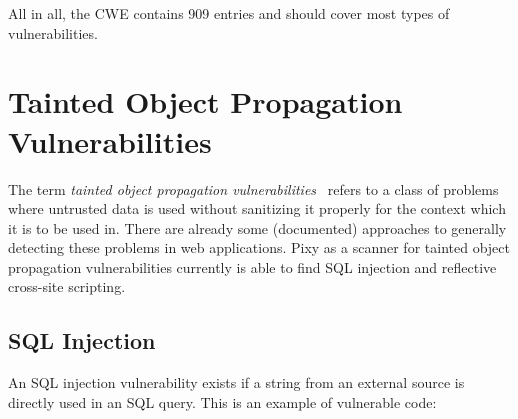 All in all, the CWE contains 909 entries and should cover most types of vulnerabilities.~\cite{cwe-all}

\section{Tainted Object Propagation Vulnerabilities}
The term \emph{tainted object propagation vulnerabilities}~\cite{finding-security-vulnerabilities} refers to a class of problems where untrusted data is used without sanitizing it properly for the context which it is to be used in. There are already some (documented) approaches to generally detecting these problems in web applications. Pixy as a scanner for tainted object propagation vulnerabilities currently is able to find SQL injection and reflective cross-site scripting.


\subsection{SQL Injection}
\label{sql-injection}
An SQL injection vulnerability exists if a string from an external source is directly used in an SQL query. This is an example of vulnerable code:

